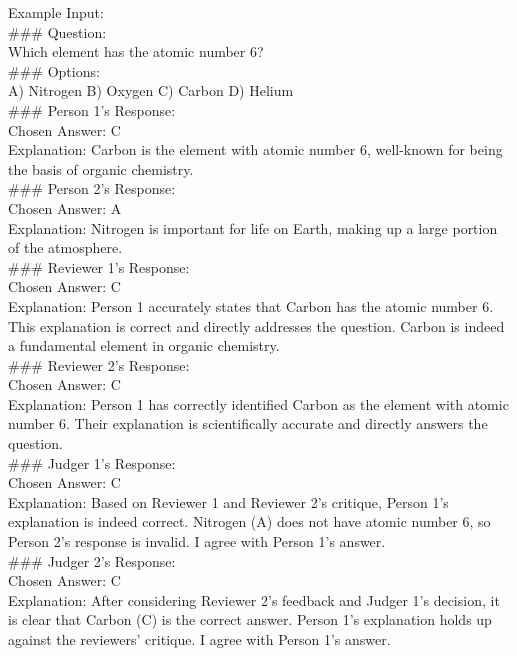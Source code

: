 \begin{figure*}[h]
\begin{tcolorbox}[colframe=cyan!40!black, title=\textbf{Prompt for $C^3$ Generation (Part 2)}]


Example Input: \\
\#\#\# Question: \\
Which element has the atomic number 6? \\
\#\#\# Options: \\
A) Nitrogen \quad B) Oxygen \quad C) Carbon \quad D) Helium \\

\#\#\# Person 1's Response: \\
Chosen Answer: C \\
Explanation: Carbon is the element with atomic number 6, well-known for being the basis of organic chemistry. \\

\#\#\# Person 2's Response: \\
Chosen Answer: A \\
Explanation: Nitrogen is important for life on Earth, making up a large portion of the atmosphere. \\

\#\#\# Reviewer 1's Response: \\
Chosen Answer: C \\
Explanation: Person 1 accurately states that Carbon has the atomic number 6. This explanation is correct and directly addresses the question. Carbon is indeed a fundamental element in organic chemistry. \\

\#\#\# Reviewer 2's Response: \\
Chosen Answer: C \\
Explanation: Person 1 has correctly identified Carbon as the element with atomic number 6. Their explanation is scientifically accurate and directly answers the question. \\

\#\#\# Judger 1's Response: \\
Chosen Answer: C \\
Explanation: Based on Reviewer 1 and Reviewer 2's critique, Person 1's explanation is indeed correct. Nitrogen (A) does not have atomic number 6, so Person 2's response is invalid. I agree with Person 1's answer. \\

\#\#\# Judger 2's Response: \\
Chosen Answer: C \\
Explanation: After considering Reviewer 2’s feedback and Judger 1's decision, it is clear that Carbon (C) is the correct answer. Person 1’s explanation holds up against the reviewers' critique. I agree with Person 1’s answer. \\


\end{tcolorbox}
\end{figure*}

